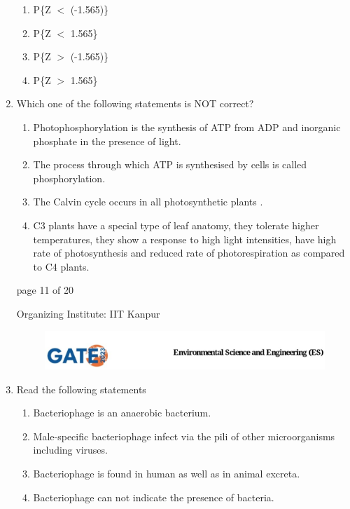 \documentclass[journal,12pt,onecolumn]{IEEEtran}
\theoremstyle{remark}
\begin{document}
\begin{enumerate}[start=1, label={Q\arabic*.}]
\begin{enumerate}[label=(\Alph*)]
\item P\{Z $<$ (-1.565)\}
\item P\{Z $<$ 1.565\}
\item P\{Z $>$ (-1.565)\}
\item P\{Z $>$ 1.565\}
\end{enumerate}
\hfill{}
\item Which one of the following statements is NOT correct?
\begin{enumerate}[label=(\Alph*)]
\item Photophosphorylation is the synthesis of ATP from ADP and inorganic phosphate in the presence of light.
\item The process through which ATP is synthesised by cells  is called phosphorylation.
\item The Calvin cycle  occurs in all photosynthetic plants .
\item C3 plants have a special type of leaf anatomy, they tolerate higher temperatures, they show a response to high light intensities, have high rate of photosynthesis and reduced rate of photorespiration as compared to C4 plants.
\end{enumerate}
\hfill{}
\vfill
\begin{center}
{\Large page 11 of 20}
\end{center}
\RaggedRight
{\color{orange}
{\Large Organizing Institute: IIT Kanpur}}
\newpage
\begin{figure}
    
    \includegraphics[width=1\linewidth]{figs/latex.jpg}
    
\end{figure}
\item Read the following statements
\begin{enumerate}[label=\Roman*.]
\item Bacteriophage is an anaerobic bacterium.
\item Male-specific bacteriophage infect via the pili of other microorganisms including viruses.
\item Bacteriophage is found in human as well as in animal excreta.
\item Bacteriophage can not indicate the presence of bacteria.
\end{enumerate}


\end{enumerate}
\end{document}

